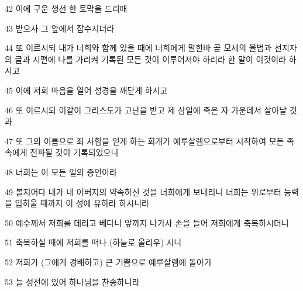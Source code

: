 \par 42 이에 구운 생선 한 토막을 드리매
\par 43 받으사 그 앞에서 잡수시더라
\par 44 또 이르시되 내가 너희와 함께 있을 때에 너희에게 말한바 곧 모세의 율법과 선지자의 글과 시편에 나를 가리켜 기록된 모든 것이 이루어져야 하리라 한 말이 이것이라 하시고
\par 45 이에 저희 마음을 열어 성경을 깨닫게 하시고
\par 46 또 이르시되 이같이 그리스도가 고난을 받고 제 삼일에 죽은 자 가운데서 살아날 것과
\par 47 또 그의 이름으로 죄 사함을 얻게 하는 회개가 예루살렘으로부터 시작하여 모든 족속에게 전파될 것이 기록되었으니
\par 48 너희는 이 모든 일의 증인이라
\par 49 볼지어다 내가 내 아버지의 약속하신 것을 너희에게 보내리니 너희는 위로부터 능력을 입히울 때까지 이 성에 유하라 하시니라
\par 50 예수께서 저희를 데리고 베다니 앞까지 나가사 손을 들어 저희에게 축복하시더니
\par 51 축복하실 때에 저희를 떠나 (하늘로 올리우) 시니
\par 52 저희가 (그에게 경배하고) 큰 기쁨으로 예루살렘에 돌아가
\par 53 늘 성전에 있어 하나님을 찬송하니라


